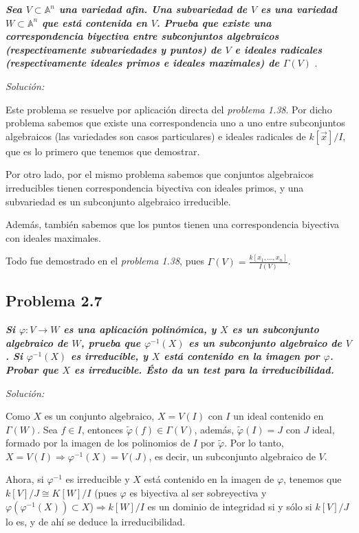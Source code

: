 \textit{\textbf{Sea $V\subset \mathbb{A}^n$ una variedad afin. Una subvariedad de $V$ es una variedad $W\subset \mathbb{A}^n$ que está contenida en $V$. Prueba que existe una correspondencia biyectiva entre subconjuntos algebraicos (respectivamente subvariedades y puntos) de $V$ e ideales radicales (respectivamente ideales primos e ideales maximales) de $\Gamma(V)$ }}.

\textit{Solución: }

Este problema se resuelve por aplicación directa del \textit{problema 1.38}. Por dicho problema sabemos que existe una correspondencia uno a uno entre subconjuntos algebraicos (las variedades son casos particulares) e ideales radicales de $k[\vec{x}]/I$, que es lo primero que tenemos que demostrar.

Por otro lado, por el mismo problema sabemos que conjuntos algebraicos irreducibles tienen correspondencia biyectiva con ideales primos, y una subvariedad es un subconjunto algebraico irreducible.

Además, también sabemos que los puntos tienen una correspondencia biyectiva con ideales maximales.

Todo fue demostrado en el \textit{problema 1.38}, pues $\Gamma(V)=\frac{k[x_1,\dots,x_n]}{I(V)} $.

\vspace{30mm}
\subsection{Problema 2.7}

\textit{\textbf{Si $\varphi:V\rightarrow W$ es una aplicación polinómica, y $X$ es un subconjunto algebraico de $W$, prueba que $\varphi^{-1}(X)$ es un subconjunto algebraico de $V$. Si $\varphi^{-1}(X)$ es irreducible, y $X$ está contenido en la imagen por $\varphi$. Probar que $X$ es irreducible. Ésto da un test para la irreducibilidad.}}

\textit{Solución: }

Como $X$ es un conjunto algebraico, $X=V(I)$ con $I$ un ideal contenido en $\Gamma(W)$. Sea $f\in I$, entonces $\tilde{\varphi}(f)\in \Gamma(V)$, además, $\tilde{\varphi}(I)=J$ con $J$ ideal, formado por la imagen de los polinomios de $I$ por $\tilde{\varphi}$. Por lo tanto, $X=V(I)\Rightarrow \varphi^{-1}(X)=V(J)$, es decir, un subconjunto algebraico de $V$.

Ahora, si $\varphi^{-1}$ es irreducible y $X$ está contenido en la imagen de $\varphi$, tenemos que $k[V]/J \cong K[W]/I $ (pues $\varphi$ es biyectiva al ser sobreyectiva y $\varphi(\varphi^{-1}(X))\subset X$)$ \Rightarrow k[W]/I$ es un dominio de integridad si y sólo si $k[V]/J$ lo es, y de ahí se deduce la irreducibilidad. 
